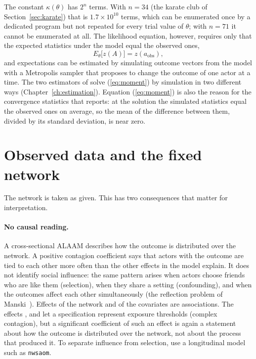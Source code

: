 The constant $\kappa(\theta)$ has $2^n$ terms. With $n=34$ (the karate club of Section~\ref{sec:karate}) that is $1.7\times10^{10}$ terms, which can be enumerated once by a dedicated program but not repeated for every trial value of $\theta$; with $n=71$ it cannot be enumerated at all. The likelihood equation, however, requires only that the expected statistics under the model equal the observed ones,
\begin{equation}
  E_\theta\bigl[z(A)\bigr]=z(a_{\text{obs}}),
  \label{eq:moment}
\end{equation}
and expectations can be estimated by simulating outcome vectors from the model with a Metropolis sampler that proposes to change the outcome of one actor at a time. The two estimators of \nwalaam{} solve (\ref{eq:moment}) by simulation in two different ways (Chapter~\ref{ch:estimation}). Equation (\ref{eq:moment}) is also the reason for the convergence statistics that \nwalaam{} reports: at the solution the simulated statistics equal the observed ones on average, so the mean of the difference between them, divided by its standard deviation, is near zero.

\section{Observed data and the fixed network}

The network is taken as given. This has two consequences that matter for interpretation.

\paragraph{No causal reading.} A cross-sectional ALAAM describes how the outcome is distributed over the network. A positive contagion coefficient says that actors with the outcome are tied to each other more often than the other effects in the model explain. It does not identify social influence: the same pattern arises when actors choose friends who are like them (selection), when they share a setting (confounding), and when the outcomes affect each other simultaneously (the reflection problem of Manski~\cite{manski1993}). Effects of the network and of the covariates are associations. The effects ,  and  let a specification represent exposure thresholds (complex contagion), but a significant coefficient of such an effect is again a statement about how the outcome is distributed over the network, not about the process that produced it. To separate influence from selection, use a longitudinal model such as \texttt{nwsaom}.


